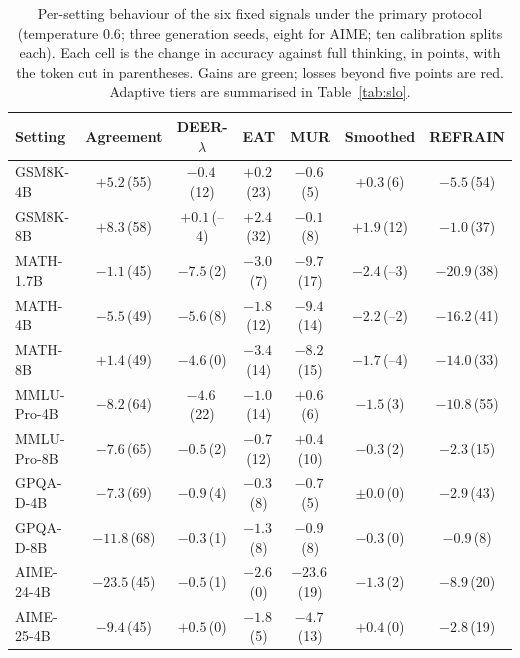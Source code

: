 \documentclass[acmsmall]{acmart}
\newcommand{\up}[1]{\textcolor{gd}{#1}}
\newcommand{\dn}[1]{\textcolor{bd}{#1}}
\theoremstyle{acmdefinition}%
\theoremstyle{acmplain}}{}%
\begin{document}
\begin{table}[t]
\caption{Per-setting behaviour of the six fixed signals under the primary protocol (temperature $0.6$; three generation seeds, eight for AIME; ten calibration splits each). Each cell is the change in accuracy against full thinking, in points, with the token cut in parentheses. Gains are green; losses beyond five points are red. Adaptive tiers are summarised in Table~\ref{tab:slo}.}
\label{tab:perbench}
\footnotesize
\setlength{\tabcolsep}{3.4pt}
\begin{tabular}{@{}lcccccc@{}}
\toprule
\textbf{Setting} & \textbf{Agreement} & \textbf{DEER-$\lambda$} & \textbf{EAT} & \textbf{MUR} & \textbf{Smoothed} & \textbf{REFRAIN} \\
\midrule
GSM8K-4B      & \up{$+5.2$}\,(55) & $-0.4$\,(12) & $+0.2$\,(23) & $-0.6$\,(5)  & $+0.3$\,(6)  & \dn{$-5.5$}\,(54) \\
GSM8K-8B      & \up{$+8.3$}\,(58) & $+0.1$\,(--4)& \up{$+2.4$}\,(32) & $-0.1$\,(8) & \up{$+1.9$}\,(12) & $-1.0$\,(37) \\
MATH-1.7B     & $-1.1$\,(45)      & \dn{$-7.5$}\,(2) & $-3.0$\,(7) & \dn{$-9.7$}\,(17) & $-2.4$\,(--3) & \dn{$-20.9$}\,(38) \\
MATH-4B       & \dn{$-5.5$}\,(49) & \dn{$-5.6$}\,(8) & $-1.8$\,(12) & \dn{$-9.4$}\,(14) & $-2.2$\,(--2) & \dn{$-16.2$}\,(41) \\
MATH-8B       & \up{$+1.4$}\,(49) & $-4.6$\,(0)  & $-3.4$\,(14) & \dn{$-8.2$}\,(15) & $-1.7$\,(--4) & \dn{$-14.0$}\,(33) \\
MMLU-Pro-4B   & \dn{$-8.2$}\,(64) & $-4.6$\,(22) & $-1.0$\,(14) & $+0.6$\,(6)  & $-1.5$\,(3)  & \dn{$-10.8$}\,(55) \\
MMLU-Pro-8B   & \dn{$-7.6$}\,(65) & $-0.5$\,(2)  & $-0.7$\,(12) & $+0.4$\,(10) & $-0.3$\,(2)  & $-2.3$\,(15) \\
GPQA-D-4B     & \dn{$-7.3$}\,(69) & $-0.9$\,(4)  & $-0.3$\,(8)  & $-0.7$\,(5)  & $\pm0.0$\,(0)& $-2.9$\,(43) \\
GPQA-D-8B     & \dn{$-11.8$}\,(68)& $-0.3$\,(1)  & $-1.3$\,(8)  & $-0.9$\,(8)  & $-0.3$\,(0)  & $-0.9$\,(8) \\
AIME-24-4B    & \dn{$-23.5$}\,(45)& $-0.5$\,(1)  & $-2.6$\,(0)  & \dn{$-23.6$}\,(19) & $-1.3$\,(2) & \dn{$-8.9$}\,(20) \\
AIME-25-4B    & \dn{$-9.4$}\,(45) & $+0.5$\,(0)  & $-1.8$\,(5)  & $-4.7$\,(13) & $+0.4$\,(0)  & $-2.8$\,(19) \\
\bottomrule
\end{tabular}
\end{table}
\end{document}
